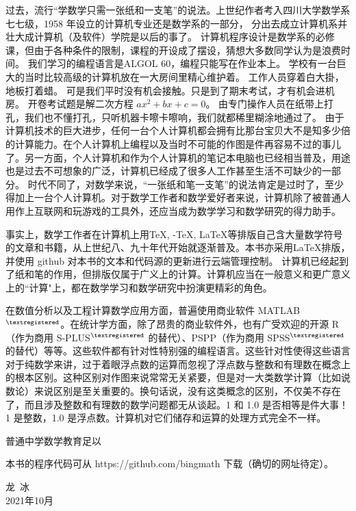 \documentclass[main.tex]{subfiles}
\begin{document}
过去，流行“学数学只需一张纸和一支笔”的说法。上世纪作者考入四川大学数学系七七级，1958 年设立的计算机专业还是数学系的一部分，
分出去成立计算机系并壮大成计算机（及软件）学院是以后的事了。
计算机程序设计是数学系的必修课，但由于各种条件的限制，课程的开设成了摆设，猜想大多数同学认为是浪费时间。
我们学习的编程语言是ALGOL 60，编程只能写在作业本上。
学校有一台巨大的当时比较高级的计算机放在一大房间里精心维护着。
工作人员穿着白大掛，地板打着蜡。
可是我们平时没有机会接触。只是到了期末考试，才有机会进机房。
开卷考试题是解二次方程 $ax^2+bx+c = 0$。
由专门操作人员在纸带上打孔，我们也不懂打孔，只听机器卡嚓卡嚓响，我们就都稀里糊涂地通过了。
由于计算机技术的巨大进步，任何一台个人计算机都会拥有比那台宝贝大不是知多少倍的计算能力。在个人计算机上编程以及当时不可能的作图是件再容易不过的事儿了。另一方面，个人计算机和作为个人计算机的笔记本电脑也已经相当普及，用途也是过去不可想象的广泛，计算机已经成了很多人工作甚至生活不可缺少的一部分。
时代不同了，对数学来说，“一张纸和笔一支笔”的说法肯定是过时了，至少得加上一台个人计算机。对于数学工作者和数学爱好者来说，计算机除了被普通人用作上互联网和玩游戏的工具外，还应当成为数学学习和数学研究的得力助手。

事实上，数学工作者在计算机上用\TeX, \AmS-\TeX, \LaTeX 等排版自己含大量数学符号的文章和书籍，从上世纪八、九十年代开始就逐渐普及。本书亦采用\LaTeX 排版， 并使用 github 对本书的文本和代码源的更新进行云端管理控制。
计算机已经起到了纸和笔的作用，但排版仅属于广义上的计算。计算机应当在一般意义和更广意义上的“计算"上，都在数学学习和数学研究中扮演更精彩的角色。

在数值分析以及工程计算数学应用方面，普遍使用商业软件 MATLAB${}^{\textregistered}$。在统计学方面，除了昂贵的商业软件外，也有广受欢迎的开源 R（作为商用 S-PLUS${}^{\textregistered}$ 的替代）、PSPP（作为商用 SPSS${}^{\textregistered}$ 的替代）等等。这些软件都有针对性特别强的编程语言。这些针对性使得这些语言对于纯数学来讲，过于着眼浮点数的运算而忽视了浮点数与整数和有理数在概念上的根本区别。这种区别对作图来说常常无关紧要，但是对一大类数学计算（比如说数论）来说区别是至关重要的。换句话说，没有这类概念的区别，不仅美不存在了，而且涉及整数和有理数的数学问题都无从谈起。1 和 1.0 是否相等是件大事！1 是整数，1.0 是浮点数。计算机对它们储存和运算的处理方式完全不一样。

普通中学数学教育足以


本书的程序代码可从 https://github.com/bingmath 下载（确切的网址待定）。


\begin{flushright}
	\centering
{\kaishu 龙\,  冰}\\
2021年10月
\end{flushright}
\end{document}

